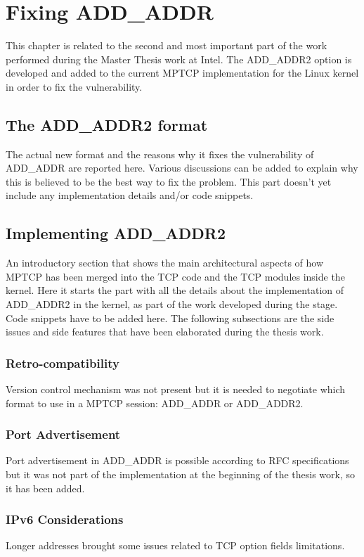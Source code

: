 \chapter{Fixing ADD\_ADDR}
\label{chap:addaddr2}

This chapter is related to the second and most important part of the work performed during the Master Thesis work at Intel. The ADD\_ADDR2 option is developed and added to the current MPTCP implementation for the Linux kernel in order to fix the vulnerability.

\section{The ADD\_ADDR2 format}
The actual new format and the reasons why it fixes the vulnerability of ADD\_ADDR are reported here. Various discussions can be added to explain why this is believed to be the best way to fix the problem. This part doesn't yet include any implementation details and/or code snippets.

\section{Implementing ADD\_ADDR2}
An introductory section that shows the main architectural aspects of how MPTCP has been merged into the TCP code and the TCP modules inside the kernel.
Here it starts the part with all the details about the implementation of ADD\_ADDR2 in the kernel, as part of the work developed during the stage. Code snippets have to be added here. The following subsections are the side issues and side features that have been elaborated during the thesis work.

\subsection{Retro-compatibility}
Version control mechanism was not present but it is needed to negotiate which format to use in a MPTCP session: ADD\_ADDR or ADD\_ADDR2.

\subsection{Port Advertisement}
Port advertisement in ADD\_ADDR is possible according to RFC specifications but it was not part of the implementation at the beginning of the thesis work, so it has been added.

\subsection{IPv6 Considerations}
Longer addresses brought some issues related to TCP option fields limitations.

